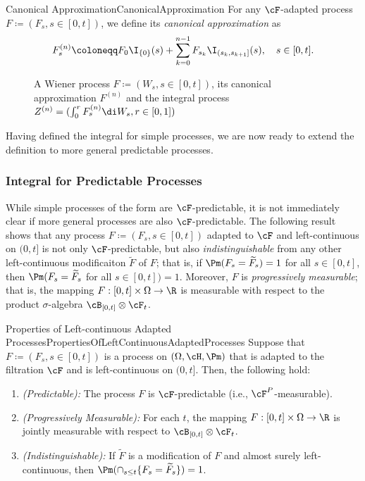 \begin{defn}{Canonical Approximation}{CanonicalApproximation}
	For any \(\cF\)-adapted process \(F \coloneqq (F_s, s \in [0, t])\), we define its \emph{canonical approximation} as
	\begin{equation}\label{eq:CanonicalApproximationDef}
		F_s^{(n)} \coloneqq F_0 \I_{\{0\}}(s) + \sum_{k=0}^{n-1} F_{s_k} \I_{(s_k, s_{k+1}]}(s), \quad s \in [0, t].
	\end{equation}
\end{defn}

\begin{figure}[H]
	\centering
	
	\caption{A Wiener process \(F \coloneqq (W_s, s \in [0, t])\), its canonical approximation \(F^{(n)}\) and the \Ito{} integral process \(Z^{(n)} = (\int_0^r F_s^{(n)} \di W_s, r \in [0, 1])\)}
	\label{fig:WienerProcessApproximation}
\end{figure}

Having defined the \Ito{} integral for simple processes, we are now ready to extend the definition to more general predictable processes.

\subsubsection{\Ito{} Integral for Predictable Processes}
While simple processes of the form  are \(\cF\)-predictable, it is not immediately clear if more general processes are also \(\cF\)-predictable. The following result shows that any process \(F \coloneqq (F_s, s \in [0, t])\) adapted to \(\cF\) and left-continuous on \((0,t]\) is not only \(\cF\)-predictable, but also \textit{indistinguishable} from any other left-continuous modificaiton \(\tilde{F}\) of \(F\); that is, if \(\Pm(F_s=\widetilde{F}_s)=1\) for all \(s \in [0,t]\), then \(\Pm(F_s = \widetilde{F}_s\) for all \(s \in [0,t]) = 1\). Moreover, \(F\) is \textit{progressively measurable}; that is, the mapping \(F : [0,t] \times \Omega \rightarrow \R\) is measurable with respect to the product \(\sigma\)-algebra \(\cB_{[0,t]} \otimes \cF_t\).

\begin{thm}{Properties of Left-continuous Adapted Processes}{PropertiesOfLeftContinuousAdaptedProcesses}
	Suppose that \(F \coloneqq (F_s, s \in [0, t])\) is a process on \((\Omega, \cH, \Pm)\) that is adapted to the filtration \(\cF\) and is left-continuous on \((0, t]\). Then, the following hold:
	\begin{enumerate}
		\item \emph{(Predictable):} The process \(F\) is \(\cF\)-predictable (i.e., \(\cF^P\)-measurable).
		\item \emph{(Progressively Measurable):} For each \(t\), the mapping \(F : [0, t] \times \Omega \to \R\) is jointly measurable with respect to \(\cB_{[0, t]} \otimes \cF_t\).
		\item \emph{(Indistinguishable):} If \(\widetilde{F}\) is a modification of \(F\) and almost surely left-continuous, then \(\Pm(\cap_{s \le t} \{F_s = \widetilde{F}_s\}) = 1\).
	\end{enumerate}
\end{thm}

